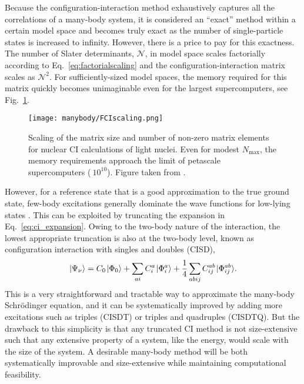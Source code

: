 \documentclass[thesis.tex]{subfiles}
\begin{document}
Because the configuration-interaction method exhaustively captures all the correlations of a many-body system, it is considered an ``exact'' method within a certain model space and becomes truly exact as the number of single-particle states is increased to infinity.  However, there is a price to pay for this exactness.  The number of Slater determinants, $\mathcal{N}$, in model space scales factorially according to Eq.\ \eqref{eq:factorialscaling} and the configuration-interaction matrix scales as $\mathcal{N}^{2}$.  For sufficiently-sized model spaces, the memory required for this matrix quickly becomes unimaginable even for the largest supercomputers, see Fig.\ \ref{fig:fciscaling}.
\begin{figure}[h]
  \centering
  \texttt{[image: manybody/FCIscaling.png]}
  \caption{Scaling of the matrix size and number of non-zero matrix elements for nuclear CI calculations of light nuclei.  Even for modest $N_{\text{max}}$, the memory requirements approach the limit of petascale supercomputers ($~10^{10}$).  Figure taken from \cite{SHAO2016}.}
  \label{fig:fciscaling}
\end{figure}

However, for a reference state that is a good approximation to the true ground state, few-body excitations generally dominate the wave functions for low-lying states \cite{SHERRILL1999143}.  This can be exploited by truncating the expansion in Eq.\ \eqref{eq:ci_expansion}.  Owing to the two-body nature of the interaction, the lowest appropriate truncation is also at the two-body level, known as configuration interaction with singles and doubles (CISD),
\begin{equation} \label{eq:cisd_expansion}
  \ket{\Psi_{\nu}} = C_{0}\ket{\Phi_{0}} + \sum_{\mathclap{a i}} C^{a}_{i}\ket{\Phi^{a}_{i}} + \frac{1}{4}\sum_{\mathclap{a b i j}} C^{ab}_{ij}\ket{\Phi^{ab}_{ij}}.
\end{equation}
This is a very straightforward and tractable way to approximate the many-body Schr\"{o}dinger equation, and it can be systematically improved by adding more excitations such as triples (CISDT) or triples and quadruples (CISDTQ).  But the drawback to this simplicity is that any truncated CI method is not size-extensive such that any extensive property of a system, like the energy, would scale with the size of the system.  A desirable many-body method will be both systematically improvable and size-extensive while maintaining computational feasibility.
\end{document}
